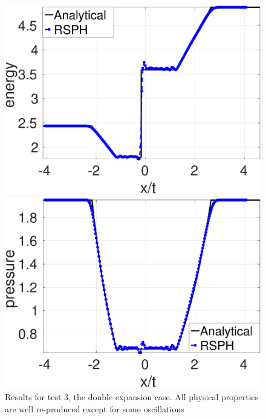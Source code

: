 \begin{figure}[H]
\begin{minipage}{.495\textwidth}
        \includegraphics[width=0.99 \textwidth]{Chapter-4/Figures/double_exp/Dexp-RCM-e}
    \end{minipage}%
    \begin{minipage}{.495 \textwidth}
        \centering
        \includegraphics[width=0.99 \textwidth]{Chapter-4/Figures/double_exp/Dexp-RCM-p}
    \end{minipage}%
    \caption{Results for test 3, the double expansion case. All physical properties are well re-produced except for some oscillations}
    \label{fig:RCM-double-expansion}
\end{figure}

